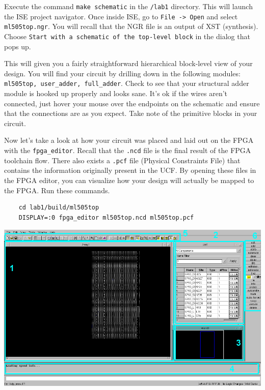 \documentclass[11pt]{article}
\begin{document}
Execute the command \verb|make schematic| in the \verb|/lab1| directory. This will launch the ISE project navigator. Once inside ISE, go to \verb|File -> Open| and select \verb|ml505top.ngr|. You will recall that the NGR file is an output of XST (synthesis). Choose \verb|Start with a schematic of the top-level block| in the dialog that pops up.

This will given you a fairly straightforward hierarchical block-level view of your design. You will find your circuit by drilling down in the following modules: \verb|ml505top, user_adder, full_adder|. Check to see that your structural adder module is hooked up properly and looks sane. It's ok if the wires aren't connected, just hover your mouse over the endpoints on the schematic and ensure that the connections are as you expect. Take note of the primitive blocks in your circuit.

Now let's take a look at how your circuit was placed and laid out on the FPGA with the \verb|fpga_editor|. Recall that the \verb|.ncd| file is the final result of the FPGA toolchain flow. There also exists a \verb|.pcf| file (Physical Constraints File) that contains the information originally present in the UCF. By opening these files in the FPGA editor, you can visualize how your design will actually be mapped to the FPGA. Run these commands.

\begin{verbatim}
	cd lab1/build/ml505top
	DISPLAY=:0 fpga_editor ml505top.ncd ml505top.pcf
\end{verbatim}

\begin{center}
	\includegraphics[width=\textwidth]{images/fpga_editor_1.png}
\end{center}
\end{document}
